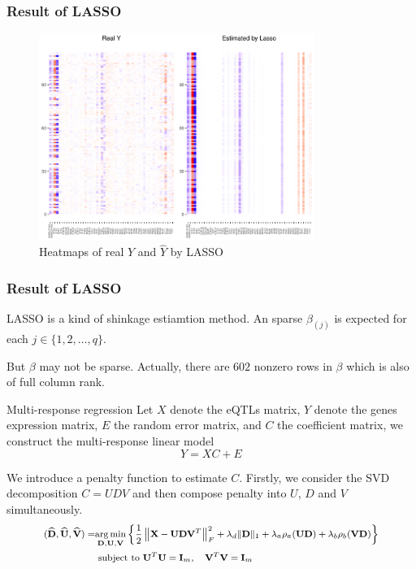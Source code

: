 \begin{frame}
    \frametitle{Result of LASSO}

    \begin{figure}[h]
        \centering
        \includegraphics[width=0.8\textwidth]{./figs/lasso.pdf}
        \caption{Heatmaps of real $Y$ and $\hat{Y}$ by LASSO}
    \end{figure}
\end{frame}

\begin{frame}
    \frametitle{Result of LASSO}
    LASSO is a kind of shinkage estiamtion method. 
    An sparse $\beta_{(j)}$ is expected for each $j\in\{ 1,2,\dots,q \}$. 

    But $\mathbb{\beta}$ may not be sparse. 
    Actually, there are $602$ nonzero rows in $\mathbb{\beta}$ which is also of full column rank. 
\end{frame}

\begin{frame}{Multi-response regression}
    Let $X$ denote the eQTLs matrix, $Y$ denote the genes expression matrix, $E$ the random error matrix, and $C$ the coefficient matrix, we construct the multi-response linear model
    \begin{equation*}
        Y = XC + E
    \end{equation*}
    
    We introduce a penalty function to estimate $C$. 
    Firstly, we consider the SVD decomposition $C= UDV$ and then compose penalty into $U$, $D$ and $V$ simultaneously. 
    \begin{equation*}\footnotesize
        \begin{split}
            (\widehat{\mathbf{D}}, \widehat{\mathbf{U}}, \widehat{\mathbf{V}})
            = & \underset{\mathbf{D}, \mathbf{U}, \mathbf{V}}{\arg \min }\left\{\frac{1}{2}\left\|\mathbf{X}-\mathbf{U D V}^{T}\right\|_{F}^{2}+\lambda_{d}\|\mathbf{D}\|_{1}+\lambda_{a} \rho_{a}(\mathbf{U D})+\lambda_{b} \rho_{b}(\mathbf{V D})\right\} \\ 
            & \text { subject to } \mathbf{U}^{T} \mathbf{U}=\mathbf{I}_{m}, \quad \mathbf{V}^{T} \mathbf{V}=\mathbf{I}_{m} 
        \end{split}
    \end{equation*}
\end{frame}

